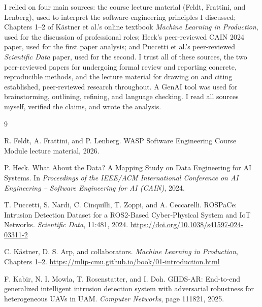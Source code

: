 \documentclass[11pt,a4paper]{article}
\begin{document}
I relied on four main sources: the course lecture material (Feldt, Frattini, and Lenberg), used to interpret the software-engineering principles I discussed; Chapters 1--2 of K\"astner et al.'s online textbook \emph{Machine Learning in Production}, used for the discussion of professional roles; Heck's peer-reviewed CAIN 2024 paper, used for the first paper analysis; and Puccetti et al.'s peer-reviewed \emph{Scientific Data} paper, used for the second. I trust all of these sources, the two peer-reviewed papers for undergoing formal review and reporting concrete, reproducible methods, and the lecture material for drawing on and citing established, peer-reviewed research throughout. A GenAI tool was used for brainstorming, outlining, refining, and language checking. I read all sources myself, verified the claims, and wrote the analysis.


\begin{thebibliography}{9}

R. Feldt, A. Frattini, and P. Lenberg.
\newblock WASP Software Engineering Course Module lecture material, 2026.

P. Heck.
\newblock What About the Data? A Mapping Study on Data Engineering for AI
Systems.
\newblock In \emph{Proceedings of the IEEE/ACM International Conference on
AI Engineering -- Software Engineering for AI (CAIN)}, 2024.

T. Puccetti, S. Nardi, C. Cinquilli, T. Zoppi, and A. Ceccarelli.
\newblock ROSPaCe: Intrusion Detection Dataset for a ROS2-Based
Cyber-Physical System and IoT Networks.
\newblock \emph{Scientific Data}, 11:481, 2024.
\newblock \url{https://doi.org/10.1038/s41597-024-03311-2}

C. K\"astner, D. S. Arp, and collaborators.
\newblock \emph{Machine Learning in Production}, Chapters 1--2.
\newblock \url{https://mlip-cmu.github.io/book/01-introduction.html}

F. Kabir, N. I. Mowla, T. Rosenstatter, and I. Doh.
\newblock GIIDS-AR: End-to-end generalized intelligent intrusion detection
system with adversarial robustness for heterogeneous UAVs in UAM.
\newblock \emph{Computer Networks}, page 111821, 2025.

\end{thebibliography}
\end{document}
